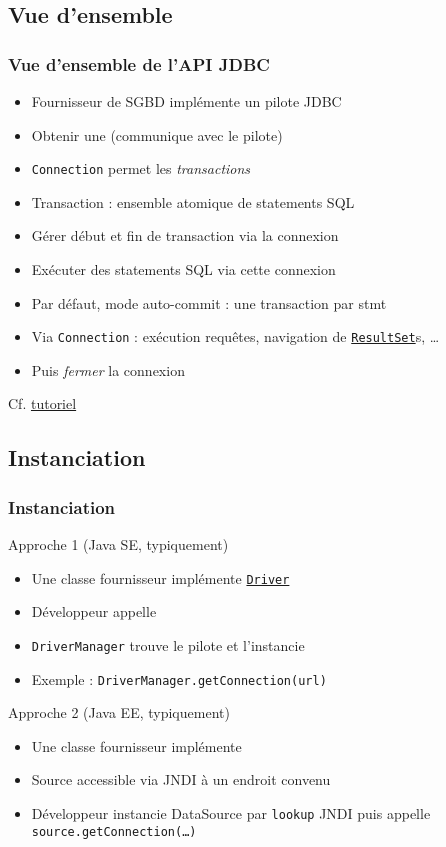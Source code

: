 \documentclass[english, french]{beamer}
\begin{document}
\subsection{Vue d’ensemble}
\begin{frame}
	\frametitle{Vue d’ensemble de l’API JDBC}
	\begin{itemize}
		\item Fournisseur de SGBD implémente un pilote JDBC
		\item Obtenir une  (communique avec le pilote)
		\item \texttt{Connection} permet les \emph{transactions}
		\item Transaction : ensemble atomique de \og{}statements\fg{} SQL
		\item Gérer début et fin de transaction via la connexion
		\item Exécuter des statements SQL via cette connexion
		\item Par défaut, mode auto-commit : une transaction par stmt
		\item Via \texttt{Connection} : exécution requêtes, navigation de \href{http://docs.oracle.com/javase/8/docs/api/java/sql/ResultSet.html}{\texttt{ResultSet}}s, …
		\item Puis \emph{fermer} la connexion
	\end{itemize}
	Cf. \href{https://docs.oracle.com/javase/tutorial/jdbc/}{tutoriel}
\end{frame}

\subsection{Instanciation}
\begin{frame}
	\frametitle{Instanciation}
	\begin{block}{Approche 1 (Java SE, typiquement)}
		\begin{itemize}
			\item Une classe fournisseur implémente \href{https://docs.oracle.com/javase/8/docs/api/java/sql/Driver.html}{\texttt{Driver}}
			\item Développeur appelle 
			\item \texttt{DriverManager} trouve le pilote et l’instancie
			\item Exemple : \texttt{DriverManager.getConnection(url)}
		\end{itemize}
	\end{block}
	\begin{block}{Approche 2 (Java EE, typiquement)}
		\begin{itemize}
			\item Une classe fournisseur implémente 
			\item Source accessible via JNDI à un endroit convenu
			\item Développeur instancie DataSource par \texttt{lookup} JNDI puis appelle \texttt{source.getConnection(…)}
		\end{itemize}
	\end{block}
\end{frame}
\end{document}
